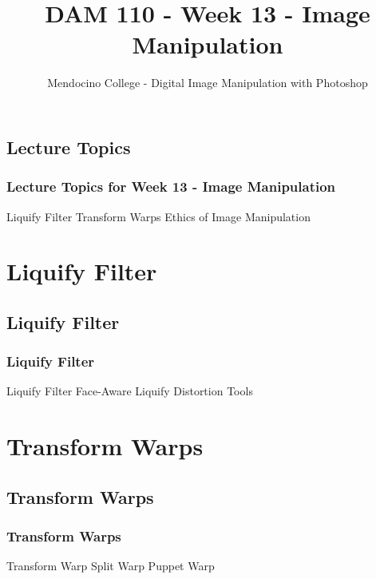 \documentclass{beamer}
\title{DAM 110 - Week 13 - Image Manipulation}
\author{Mendocino College - Digital Image Manipulation with Photoshop}
\date{\vspace{-5em}}
\begin{document}
	{
		\begin{frame}
			\vspace{-35pt}
			\maketitle
		\end{frame}
	}

	\section{}
			\subsection{Lecture Topics}		
	\begin{frame}
		\frametitle{Lecture Topics for Week 13 - Image Manipulation}
				\begin{outline}
					\1 Liquify Filter
					\1 Transform Warps
					\1 Ethics of Image Manipulation
				\end{outline}
		\end{frame}

	\section{Liquify Filter}
			\subsection{Liquify Filter}		
				\begin{frame}
					\frametitle{Liquify Filter}
					\begin{outline}
						\1 Liquify Filter
						\1 Face-Aware Liquify
						\1 Distortion Tools
					\end{outline}
				\end{frame}
			
	\section{Transform Warps}
		\subsection{Transform Warps}		
			\begin{frame}
				\frametitle{Transform Warps}
				\begin{outline}
					\1 Transform Warp
					\1 Split Warp
					\1 Puppet Warp
				\end{outline}
			\end{frame}
			
\end{document}
